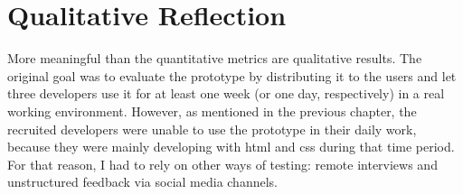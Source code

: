 \section{Qualitative Reflection}\label{qualitative-reflection}

More meaningful than the quantitative metrics are qualitative results.
The original goal was to evaluate the prototype by distributing it to
the users and let three developers use it for at least one week (or one
day, respectively) in a real working environment. However, as mentioned
in the previous chapter, the recruited developers were unable to use the
prototype in their daily work, because they were mainly developing with
\ac{html} and \ac{css} during that time period. For that reason, I had
to rely on other ways of testing: remote interviews and unstructured
feedback via social media channels.

